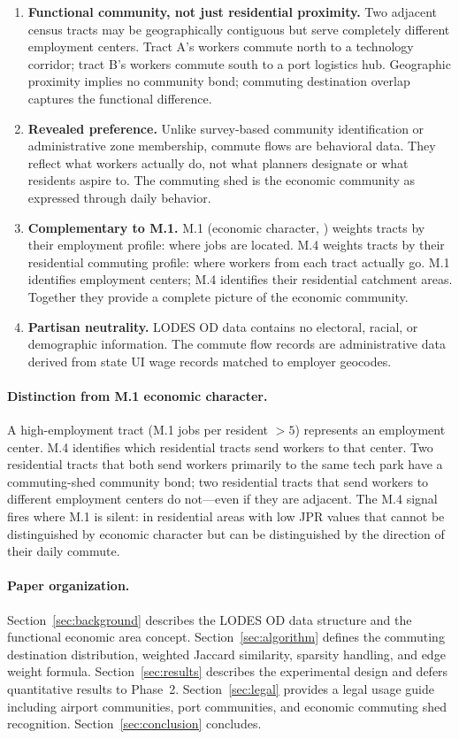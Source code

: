 \begin{enumerate}
  \item \textbf{Functional community, not just residential proximity.}
    Two adjacent census tracts may be geographically contiguous but serve
    completely different employment centers.
    Tract A's workers commute north to a technology corridor; tract B's workers
    commute south to a port logistics hub.
    Geographic proximity implies no community bond; commuting destination
    overlap captures the functional difference.
  \item \textbf{Revealed preference.}
    Unlike survey-based community identification or administrative zone
    membership, commute flows are behavioral data.
    They reflect what workers actually do, not what planners designate or
    what residents aspire to.
    The commuting shed is the economic community as expressed through daily
    behavior.
  \item \textbf{Complementary to M.1.}
    M.1 (economic character, \citep{m1econchar}) weights tracts by their
    employment profile: where jobs are located.
    M.4 weights tracts by their residential commuting profile: where workers
    from each tract actually go.
    M.1 identifies employment centers; M.4 identifies their residential
    catchment areas.
    Together they provide a complete picture of the economic community.
  \item \textbf{Partisan neutrality.}
    LODES OD data contains no electoral, racial, or demographic information.
    The commute flow records are administrative data derived from state
    UI wage records matched to employer geocodes.
\end{enumerate}

\paragraph{Distinction from M.1 economic character.}
A high-employment tract (M.1 jobs per resident $> 5$) represents an employment
center.
M.4 identifies which residential tracts send workers to that center.
Two residential tracts that both send workers primarily to the same tech park
have a commuting-shed community bond; two residential tracts that send workers
to different employment centers do not---even if they are adjacent.
The M.4 signal fires where M.1 is silent: in residential areas with low JPR
values that cannot be distinguished by economic character but can be
distinguished by the direction of their daily commute.

\paragraph{Paper organization.}
Section~\ref{sec:background} describes the LODES OD data structure and
the functional economic area concept.
Section~\ref{sec:algorithm} defines the commuting destination distribution,
weighted Jaccard similarity, sparsity handling, and edge weight formula.
Section~\ref{sec:results} describes the experimental design and defers
quantitative results to Phase~2.
Section~\ref{sec:legal} provides a legal usage guide including airport
communities, port communities, and economic commuting shed recognition.
Section~\ref{sec:conclusion} concludes.
